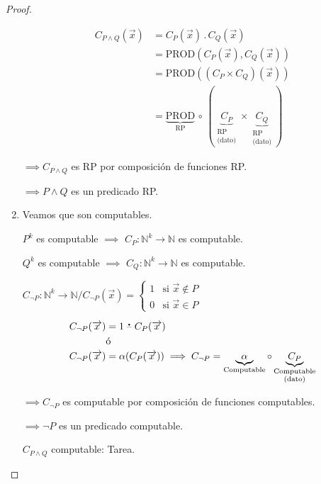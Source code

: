 \begin{proof}
\begin{enumerate}
            \begin{align*}
                C_{P \wedge Q}(\overrightarrow{x}) &= 
                C_{{P}}(\overrightarrow{x}) \, . \,
                C_{{Q}}(\overrightarrow{x}) \\
                &= \mathrm{PROD}(C_{{P}}(\overrightarrow{x}), 
                    C_{{Q}}(\overrightarrow{x})) \\
                &= \mathrm{PROD}( (C_{{P}}  \times
                    C_{{Q}}) (\overrightarrow{x})) \\
                &= \underbrace{\mathrm{PROD}}_{\text{RP}} 
                \, \circ \,
                (\underbrace{C_{{P}}}_{\substack{\text{RP}\\
                \text{(dato)}}} \times 
                    \underbrace{C_{{Q}}}_{\substack{\text{RP}\\
                    \text{(dato)}}})
            \end{align*}

            $\implies C_{P \wedge Q}$ es RP por composición de funciones RP.

            $\implies P \wedge Q$ es un predicado RP.

        \item Veamos que son computables.

            ${P}^k$ es computable $\implies$ 
            $C_{{P}}: \mathbb{N}^k \to \mathbb{N}$ es computable.

            ${Q}^k$ es computable $\implies$ 
            $C_{{Q}}: \mathbb{N}^k \to \mathbb{N}$ es computable.

            $C_{\neg P}: \mathbb{N}^k \to \mathbb{N} /
            C_{\neg P} (\overrightarrow{x}) = 
            \begin{cases}
                1 & \text{si } \overrightarrow{x} \notin {P} \\
                0 & \text{si } \overrightarrow{x} \in {P}
            \end{cases}$

            \begin{align*}
                C_{\neg P} (\overrightarrow{x}) &= 
                1 \;\accentset{\mbox{\large\bfseries .}}{\text{--}}\; C_{P}(\overrightarrow{x})\\
                &\text{ó} \\
                C_{\neg P} (\overrightarrow{x}) &= 
                \alpha(C_{P}(\overrightarrow{x})) \implies C_{\neg P} 
                = \underbrace{\alpha}_{\text{Computable}} \circ 
                \underbrace{C_{{P}}}_{\substack{\text{Computable}\\
                    \text{(dato)}}}
            \end{align*}


            $\implies C_{\neg P}$ es computable por composición de funciones
            computables.

            $\implies \neg {P}$ es un predicado computable.

            \smallskip

            $C_{P \wedge Q}$ computable: Tarea.
    \end{enumerate}
\end{proof}


